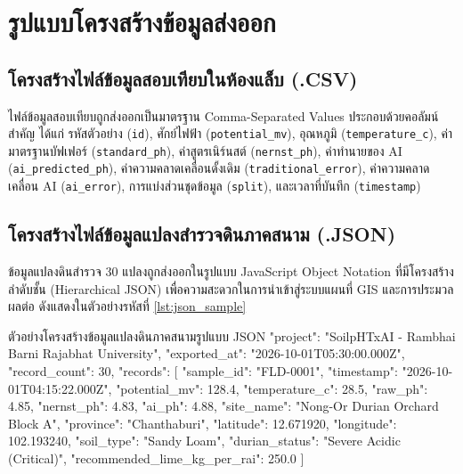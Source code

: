 \section{รูปแบบโครงสร้างข้อมูลส่งออก}

\subsection{โครงสร้างไฟล์ข้อมูลสอบเทียบในห้องแล็บ (.CSV)}
ไฟล์ข้อมูลสอบเทียบถูกส่งออกเป็นมาตรฐาน Comma-Separated Values ประกอบด้วยคอลัมน์สำคัญ ได้แก่ รหัสตัวอย่าง (\texttt{id}), ศักย์ไฟฟ้า (\texttt{potential\_mv}), อุณหภูมิ (\texttt{temperature\_c}), ค่ามาตรฐานบัฟเฟอร์ (\texttt{standard\_ph}), ค่าสูตรเนิร์นสต์ (\texttt{nernst\_ph}), ค่าทำนายของ AI (\texttt{ai\_predicted\_ph}), ค่าความคลาดเคลื่อนดั้งเดิม (\texttt{traditional\_error}), ค่าความคลาดเคลื่อน AI (\texttt{ai\_error}), การแบ่งส่วนชุดข้อมูล (\texttt{split}), และเวลาที่บันทึก (\texttt{timestamp})

\subsection{โครงสร้างไฟล์ข้อมูลแปลงสำรวจดินภาคสนาม (.JSON)}
ข้อมูลแปลงดินสำรวจ 30 แปลงถูกส่งออกในรูปแบบ JavaScript Object Notation ที่มีโครงสร้างลำดับชั้น (Hierarchical JSON) เพื่อความสะดวกในการนำเข้าสู่ระบบแผนที่ GIS และการประมวลผลต่อ ดังแสดงในตัวอย่างรหัสที่ \ref{lst:json_sample}

\begin{codebox}[language=Java]{ตัวอย่างโครงสร้างข้อมูลแปลงดินภาคสนามรูปแบบ JSON}
{
  "project": "SoilpHTxAI - Rambhai Barni Rajabhat University",
  "exported_at": "2026-10-01T05:30:00.000Z",
  "record_count": 30,
  "records": [
    {
      "sample_id": "FLD-0001",
      "timestamp": "2026-10-01T04:15:22.000Z",
      "potential_mv": 128.4,
      "temperature_c": 28.5,
      "raw_ph": 4.85,
      "nernst_ph": 4.83,
      "ai_ph": 4.88,
      "site_name": "Nong-Or Durian Orchard Block A",
      "province": "Chanthaburi",
      "latitude": 12.671920,
      "longitude": 102.193240,
      "soil_type": "Sandy Loam",
      "durian_status": "Severe Acidic (Critical)",
      "recommended_lime_kg_per_rai": 250.0
    }
  ]
}
\end{codebox}
\label{lst:json_sample}

\clearpage
